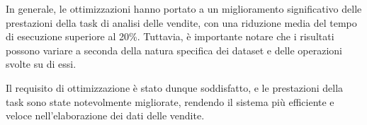 In generale, le ottimizzazioni hanno portato a un miglioramento significativo delle prestazioni della task di analisi delle vendite, con una riduzione media del tempo di esecuzione superiore al 20\%. Tuttavia, è importante notare che i risultati possono variare a seconda della natura specifica dei dataset e delle operazioni svolte su di essi.

Il requisito di ottimizzazione è stato dunque soddisfatto, e le prestazioni della task sono state notevolmente migliorate, rendendo il sistema più efficiente e veloce nell'elaborazione dei dati delle vendite.

